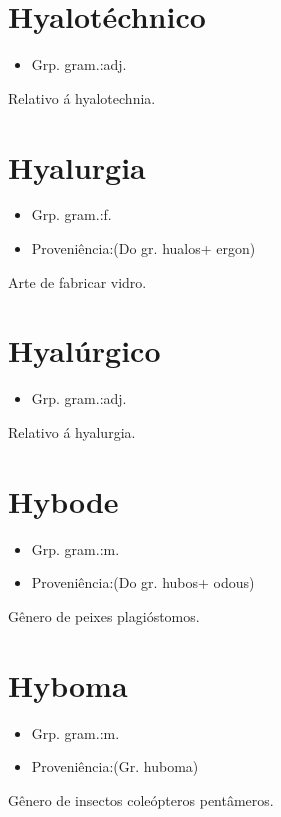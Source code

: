 \documentclass{article}
\begin{document}
\section{Hyalotéchnico}
\begin{itemize}
\item {Grp. gram.:adj.}
\end{itemize}
Relativo á hyalotechnia.
\section{Hyalurgia}
\begin{itemize}
\item {Grp. gram.:f.}
\end{itemize}
\begin{itemize}
\item {Proveniência:(Do gr. \textunderscore hualos\textunderscore  + \textunderscore ergon\textunderscore )}
\end{itemize}
Arte de fabricar vidro.
\section{Hyalúrgico}
\begin{itemize}
\item {Grp. gram.:adj.}
\end{itemize}
Relativo á hyalurgia.
\section{Hybode}
\begin{itemize}
\item {Grp. gram.:m.}
\end{itemize}
\begin{itemize}
\item {Proveniência:(Do gr. \textunderscore hubos\textunderscore  + \textunderscore odous\textunderscore )}
\end{itemize}
Gênero de peixes plagióstomos.
\section{Hyboma}
\begin{itemize}
\item {Grp. gram.:m.}
\end{itemize}
\begin{itemize}
\item {Proveniência:(Gr. \textunderscore huboma\textunderscore )}
\end{itemize}
Gênero de insectos coleópteros pentâmeros.
\end{document}
